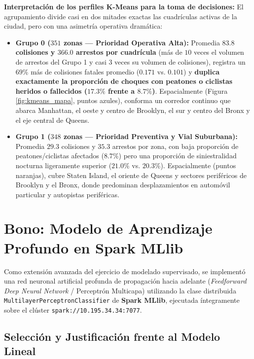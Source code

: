 \documentclass[11pt,a4paper]{article}
\begin{document}
\noindent \textbf{Interpretación de los perfiles K-Means para la toma de decisiones:}
El agrupamiento divide casi en dos mitades exactas las cuadrículas activas de la ciudad, pero con una asimetría operativa dramática:
\begin{itemize}
    \item \textbf{Grupo 0 ($351$ zonas --- Prioridad Operativa Alta):} Promedia \textbf{$83.8$ colisiones y $366.0$ arrestos por cuadrícula} (más de $10$ veces el volumen de arrestos del Grupo 1 y casi $3$ veces su volumen de colisiones), registra un $69\%$ más de colisiones fatales promedio ($0.171$ vs. $0.101$) y \textbf{duplica exactamente la proporción de choques con peatones o ciclistas heridos o fallecidos ($17.3\%$ frente a $8.7\%$)}. Espacialmente (Figura \ref{fig:kmeans_mapa}, puntos azules), conforma un corredor continuo que abarca Manhattan, el oeste y centro de Brooklyn, el sur y centro del Bronx y el eje central de Queens.
    \item \textbf{Grupo 1 ($348$ zonas --- Prioridad Preventiva y Vial Suburbana):} Promedia $29.3$ colisiones y $35.3$ arrestos por zona, con baja proporción de peatones/ciclistas afectados ($8.7\%$) pero una proporción de siniestralidad nocturna ligeramente superior ($21.0\%$ vs. $20.3\%$). Espacialmente (puntos naranjas), cubre Staten Island, el oriente de Queens y sectores periféricos de Brooklyn y el Bronx, donde predominan desplazamientos en automóvil particular y autopistas periféricas.
\end{itemize}



\section{Bono: Modelo de Aprendizaje Profundo en Spark MLlib}
\label{sec:bono_dl}

Como extensión avanzada del ejercicio de modelado supervisado, se implementó una red neuronal artificial profunda de propagación hacia adelante (\textit{Feedforward Deep Neural Network} / Perceptrón Multicapa) utilizando la clase distribuida \texttt{MultilayerPerceptronClassifier} de \textbf{Spark MLlib}, ejecutada íntegramente sobre el clúster \texttt{spark://10.195.34.34:7077}.

\subsection{Selección y Justificación frente al Modelo Lineal}
\label{subsec:bono_dl_seleccion}
\end{document}
